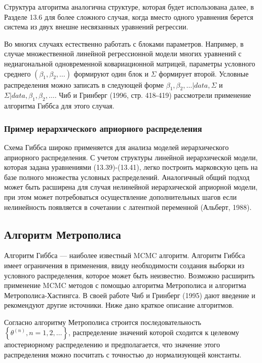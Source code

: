 Структура алгоритма аналогична структуре, которая будет использована далее, в Разделе 13.6 для более сложного случая, когда вместо одного уравнения берется система из двух внешне несвязанных уравнений регрессии.

Во многих случаях естественно работать с блоками параметров. Например, в случае множественной линейной регрессионной модели многих уравнений с недиагональной одновременной ковариационной матрицей, параметры условного среднего $(\beta_1,\beta_2,\ldots )$ формируют один блок  и $\Sigma$ формирует второй. Условные распределения можно записать в следующей форме $\beta_1,\beta_2,\ldots |data,\Sigma$ и $\Sigma|data,\beta_1,\beta_2,\ldots $. Чиб и Гринберг (1996, стр. 418-419) рассмотрели применение алгоритма Гиббса для этого случая.

\subsubsection*{Пример иерархического априорного распределения}

Схема Гиббса широко применяется для анализа моделей иерархического априорного распределения. С учетом структуры линейной иерархической модели, которая задана уравнениями (13.39)-(13.41), легко построить марковскую цепь на базе полного множества условных распределений. Аналогичный общий подход может быть расширена для случая нелинейной иерархической априорной модели, при этом может потребоваться осуществление дополнительных шагов если нелинейность появляется в сочетании с  латентной переменной (Альберт, 1988).

\subsection{Алгоритм Метрополиса}

Алгоритм Гиббса --- наиболее известный MCMC алгоритм. Алгоритм Гиббса имеет ограничения в применения, ввиду необходимости создания выборки из  условного распределения, которое может быть неизвестно. Возможно расширить применение MCMC методов с помощью алгоритма Метрополиса и алгоритма Метрополиса-Хастингса. В своей работе Чиб и Гринберг (1995) дают введение и рекомендуют  другие источники. Ниже дано краткое описание алгоритмов.

Согласно алгоритму Метрополиса строится последовательность $\left\lbrace\theta^{(n)}, n=1,2,\ldots \right\rbrace$, распределение значений которой сходится к целевому апостериорному распределению и предполагается, что значение этого распределения можно посчитать с точностью до нормализующей константы.

